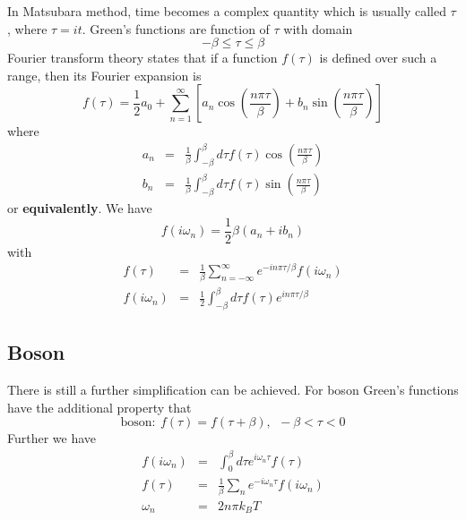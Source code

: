 In Matsubara method, time becomes a complex quantity which is usually called $\tau$, where $\tau = it$.
Green's functions are function of $\tau$ with domain
\begin{equation}
  \label{3.10}
  -\beta \leq \tau \leq \beta
\end{equation}
Fourier transform theory states that if a function $f(\tau)$ is defined over such a range, then its Fourier expansion is
\begin{equation}
  \label{3.11}
  f(\tau) = \frac{1}{2}a_0 + \sum_{n=1}^\infty \left[a_n \cos(\frac{n\pi\tau}{\beta}) + b_n \sin(\frac{n\pi\tau}{\beta})\right]
\end{equation}
where
\begin{eqnarray}
  a_n &=& \frac{1}{\beta} \int_{-\beta}^\beta d\tau f(\tau) \cos(\frac{n\pi\tau}{\beta}) \label{3.12} \\
  b_n &=& \frac{1}{\beta} \int_{-\beta}^\beta d\tau f(\tau) \sin(\frac{n\pi\tau}{\beta}) \label{3.13}
\end{eqnarray}
or \textbf{equivalently}. We have
\begin{equation}
  f(i\omega_n) = \frac{1}{2} \beta(a_n + ib_n ) \label{3.14}
\end{equation}
with
\begin{eqnarray}
  f(\tau)&=&\frac{1}{\beta} \sum_{n=-\infty}^\infty e^{-in\pi\tau/\beta} f(i\omega_n) \label{3.15} \\
  f(i\omega_n)&=& \frac{1}{2} \int_{-\beta}^\beta d\tau f(\tau) e^{in\pi\tau/\beta}   \label{3.16}
\end{eqnarray}

\subsection{Boson}
There is still a further simplification can be achieved.
For boson Green's functions have the additional property that
\begin{equation}
  \label{3.17}
  \mathrm{boson:}~ f(\tau) = f(\tau+ \beta),~ ~ -\beta<\tau<0
\end{equation}
Further we have
\begin{eqnarray}
    f(i\omega_n)&=&\int_0^\beta d\tau e^{i\omega_n\tau} f(\tau) \nonumber \\
    f(\tau) &=& \frac{1}{\beta} \sum_n e^{-i\omega_n\tau} f(i\omega_n) \label{3.20} \\
    \omega_n &=& 2n\pi k_BT\nonumber
\end{eqnarray}

